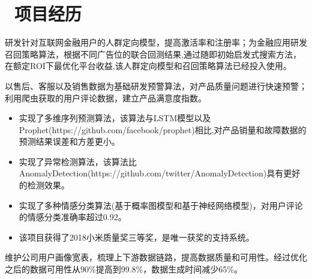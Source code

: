 \documentclass{resume}
\begin{document}

\section{\faUsers\ 项目经历}

\begin{onehalfspacing}
研发针对互联网金融用户的人群定向模型，提高激活率和注册率；为金融应用研发召回策略算法，根据不同广告位的联合回测结果,通过随即初始启发式搜索方法，在额定ROI下最优化平台收益,该人群定向模型和召回策略算法已经投入使用。
\end{onehalfspacing}


\begin{onehalfspacing}
以售后、客服以及销售数据为基础研发预警算法，对产品质量问题进行快速预警；利用爬虫获取的用户评论数据，建立产品满意度指数。
\begin{itemize}
  \item 实现了多维序列预测算法，该算法与LSTM模型以及Prophet(https://github.com/facebook/prophet)相比,对产品销量和故障数据的预测结果误差和方差更小。
  \item 实现了异常检测算法，该算法比AnomalyDetection(https://github.com/twitter/AnomalyDetection)具有更好的检测效果。
  \item 实现了多种情感分类算法(基于概率图模型和基于神经网络模型)，对用户评论的情感分类准确率超过0.92。
  \item 该项目获得了2018小米质量奖三等奖，是唯一获奖的支持系统。
\end{itemize}
\end{onehalfspacing}







\begin{onehalfspacing}
维护公司用户画像宽表，梳理上下游数据链路，提高数据质量和可用性。经过优化之后的数据可用性从90\%提高到99.8\%，数据生成时间减少65\%。
\end{onehalfspacing}
\end{document}
